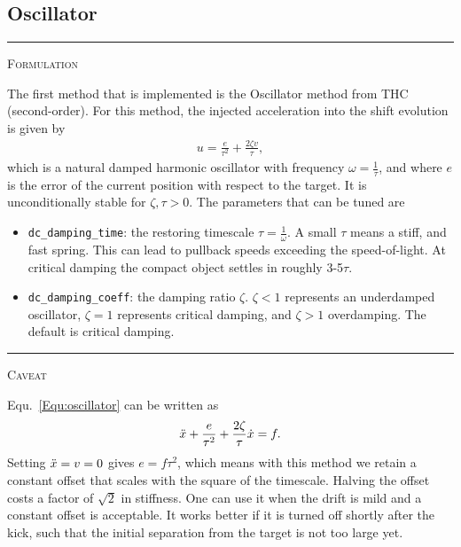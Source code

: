 \documentclass{article}
\newcommand{\var}[1]{%
  {\setlength{\fboxsep}{1.5pt}%
   \colorbox{varbg}{\textcolor{varfg}{\texttt{\small #1}}}}}
\newcommand{\step}[1]{%
  \par\medskip\noindent
  {\color{stepfg}\rule[-0.15ex]{2pt}{1.5ex}\hspace{0.5em}\scshape #1}%
  \hspace{0.75em}\ignorespaces}
\begin{document}
\subsection*{Oscillator}
\step{Formulation} The first method that is implemented is the Oscillator method from THC (second-order). For this method, the injected acceleration into the shift evolution is given by
\begin{align}\label{Equ:oscillator}
  u=\frac{e}{\tau^2}+\frac{2\zeta v}{\tau},
\end{align}
which is a natural damped harmonic oscillator with frequency $\omega=\frac{1}{\tau}$, and where $e$ is the error of the current position with respect to the target.
It is unconditionally stable for $\zeta,\tau>0$. The parameters that can be tuned are
\begin{itemize}
  \item \var{dc\_damping\_time}: the restoring timescale $\tau=\frac{1}{\omega}$. A small $\tau$ means a stiff, and fast spring. This can lead to pullback speeds exceeding the
  speed-of-light. At critical damping the compact object settles in roughly 3-5$\tau$.
  \item \var{dc\_damping\_coeff}: the damping ratio $\zeta$. $\zeta<1$ represents an underdamped oscillator, $\zeta=1$ represents critical damping, and $\zeta>1$ overdamping.
  The default is critical damping.
\end{itemize}
\step{Caveat} Equ.~\eqref{Equ:oscillator} can be written as
\begin{align}
  \Ddot{x}+\frac{e}{\tau^2}+\frac{2\zeta}{\tau}\Dot{x}=f.
\end{align}
Setting $\Ddot{x}=v=0$ gives $e=f\tau^2$, which means with this method we retain a constant offset that scales with the square of the timescale. Halving the offset
costs a factor of $\sqrt{2}$ in stiffness. One can use it when the drift is mild and a constant offset is acceptable. It works better if it is turned off shortly after the
kick, such that the initial separation from the target is not too large yet.
\end{document}
